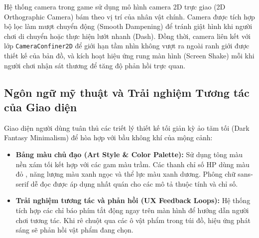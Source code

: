 \documentclass[../DoAn.tex]{subfiles}
\begin{document}
Hệ thống camera trong game sử dụng mô hình camera 2D trực giao (2D Orthographic Camera) bám theo vị trí của nhân vật chính. Camera được tích hợp bộ lọc làm mượt chuyển động (Smooth Dampening) để tránh giật hình khi người chơi di chuyển hoặc thực hiện lướt nhanh (Dash). Đồng thời, camera liên kết với lớp \texttt{CameraConfiner2D} để giới hạn tầm nhìn không vượt ra ngoài ranh giới được thiết kế của bản đồ, và kích hoạt hiệu ứng rung màn hình (Screen Shake) mỗi khi người chơi nhận sát thương để tăng độ phản hồi trực quan.
\subsection{Ngôn ngữ mỹ thuật và Trải nghiệm Tương tác của Giao diện}
\label{subsection:3.9.4}

Giao diện người dùng tuân thủ các triết lý thiết kế tối giản kỳ ảo tăm tối (Dark Fantasy Minimalism) để hòa hợp với bầu không khí của mộng cảnh:
\begin{itemize}
    \item \textbf{Bảng màu chủ đạo (Art Style \& Color Palette):} Sử dụng tông màu nền xám tối kết hợp với các gam màu trầm. Các thanh chỉ số HP dùng màu đỏ , năng lượng màu xanh ngọc và thể lực màu xanh dương. Phông chữ sans-serif dễ đọc được áp dụng nhất quán cho các mô tả thuộc tính và chỉ số.
    \item \textbf{Trải nghiệm tương tác và phản hồi (UX Feedback Loops):} Hệ thống tích hợp các chỉ báo phím tắt động ngay trên màn hình để hướng dẫn người chơi tương tác. Khi rê chuột qua các ô vật phẩm trong túi đồ, hiệu ứng phát sáng sẽ phản hồi vật phẩm đang chọn.
\end{itemize}
\end{document}
